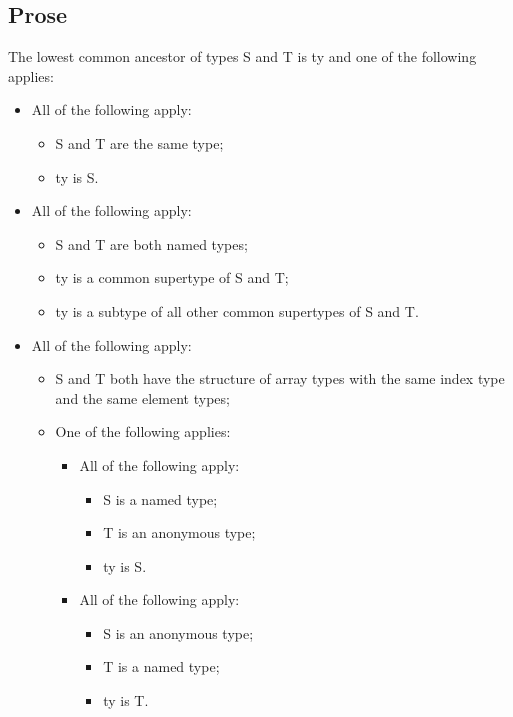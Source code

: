 \documentclass{book}
\begin{document}
\subsection{Prose}
  The lowest common ancestor of types S and T is ty and one of the following applies:
  \begin{itemize}
  \item  All of the following apply:
    \begin{itemize}
    \item  S and T are the same type;
    \item  ty is S.
    \end{itemize}

  \item  All of the following apply:
    \begin{itemize}
    \item  S and T are both named types;
    \item  ty is a common supertype of S and T;
    \item  ty is a subtype of all other common supertypes of S and T.
    \end{itemize}

  \item  All of the following apply:
    \begin{itemize}
    \item  S and T both have the structure of array types with the same index type
      and the same element types;

    \item  One of the following applies:
      \begin{itemize}
      \item  All of the following apply:
        \begin{itemize}
        \item  S is a named type;
        \item  T is an anonymous type;
        \item  ty is S.
        \end{itemize}

      \item  All of the following apply:
        \begin{itemize}
        \item  S is an anonymous type;
        \item  T is a named type;
        \item  ty is T.
        \end{itemize}
      \end{itemize}
    \end{itemize}


\end{itemize}
\end{document}
